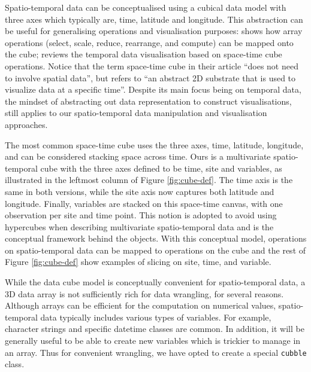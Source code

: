\documentclass[
]{jss}
\begin{document}
Spatio-temporal data can be conceptualised using a cubical data model with three axes which typically are, time, latitude and longitude. This abstraction can be useful for generalising operations and visualisation purposes: \citet{lu_multidimensional_2018} shows how array operations (select, scale, reduce, rearrange, and compute) can be mapped onto the cube; \citet{bach_review_2014} reviews the temporal data visualisation based on space-time cube operations. Notice that the term space-time cube in their article ``does not need to involve spatial data'', but refers to ``an abstract 2D substrate that is used to visualize data at a specific time''. Despite its main focus being on temporal data, the mindset of abstracting out data representation to construct visualisations, still applies to our spatio-temporal data manipulation and visualisation approaches.

The most common space-time cube uses the three axes, time, latitude, longitude, and can be considered stacking space across time. Ours is a multivariate spatio-temporal cube with the three axes defined to be time, site and variables, as illustrated in the leftmost column of Figure \ref{fig:cube-def}. The time axis is the same in both versions, while the site axis now captures both latitude and longitude. Finally, variables are stacked on this space-time canvas, with one observation per site and time point. This notion is adopted to avoid using hypercubes when describing multivariate spatio-temporal data and is the conceptual framework behind the  objects. With this conceptual model, operations on spatio-temporal data can be mapped to operations on the cube and the rest of Figure \ref{fig:cube-def} show examples of slicing on site, time, and variable.

While the data cube model is conceptually convenient for spatio-temporal data, a 3D data array is not sufficiently rich for data wrangling, for several reasons. Although arrays can be efficient for the computation on numerical values, spatio-temporal data typically includes various types of variables. For example, character strings and specific datetime classes are common. In addition, it will be generally useful to be able to create new variables which is trickier to manage in an array. Thus for convenient wrangling, we have opted to create a special \texttt{cubble} class.
\end{document}
